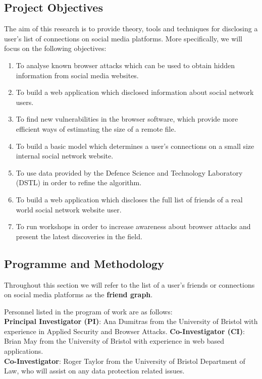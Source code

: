 \documentclass[a4paper,11pt]{article}
\begin{document}
\subsection*{Project Objectives}

The aim of this research is to provide theory, tools and techniques for disclosing a user's list of connections on social media platforms. More specifically, we will focus on the following objectives:
\begin{enumerate}
\item To analyse known browser attacks which can be used to obtain hidden information from social media websites.
\item To build a web application which disclosed information about social network users.
\item To find new vulnerabilities in the browser software, which provide more efficient ways of estimating the size of a remote file.
\item To build a basic model which determines a user's connections on a small size internal social network website.
\item To use data provided by the Defence Science and Technology Laboratory (DSTL) in order to refine the algorithm.
\item To build a web application which discloses the full list of friends of a real world social network website user.
\item To run workshops in order to increase awareness about browser attacks and present the latest discoveries in the field.
\end{enumerate}

\subsection*{Programme and Methodology}

Throughout this section we will refer to the list of a user's friends or connections on social media platforms as the \textbf{friend graph}.

Personnel listed in the program of work are as follows:\\
\textbf{Principal Investigator (PI)}: Ana Dumitras from the University of Bristol with experience in Applied Security and Browser Attacks.
\textbf{Co-Investigator (CI)}: Brian May from the University of Bristol with experience in web based applications.\\
\textbf{Co-Investigator}: Roger Taylor from the University of Bristol Department of Law, who will assist on any data protection related issues.
\end{document}
